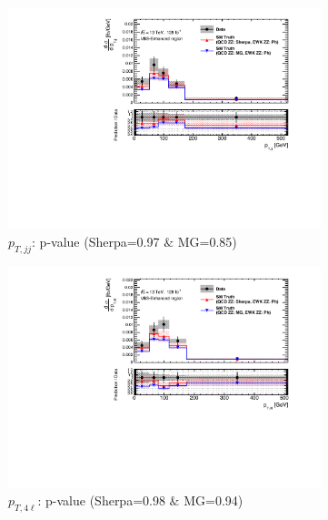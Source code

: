 \begin{figure}[!htb]
\begin{subfigure}{.48\textwidth}
        \centering
        \includegraphics[width=.98\linewidth]{figures/Results/CrossSection_VBSEnhanced/xs_ptjj_SR.pdf}
        \caption{ \footnotesize{$p_{T,jj}$: p-value (Sherpa=0.97 $\&$ MG=0.85)}}
    \end{subfigure}
    \begin{subfigure}{.48\textwidth}
        \centering
        \includegraphics[width=.98\linewidth]{figures/Results/CrossSection_VBSEnhanced/xs_pt4l_SR.pdf}
        \caption{ \footnotesize{$p_{T,4\ell}$: p-value (Sherpa=0.98 $\&$ MG=0.94)}}
    \end{subfigure}\\
    \begin{subfigure}{.48\textwidth}
        \centering

\end{subfigure}
\end{figure}
